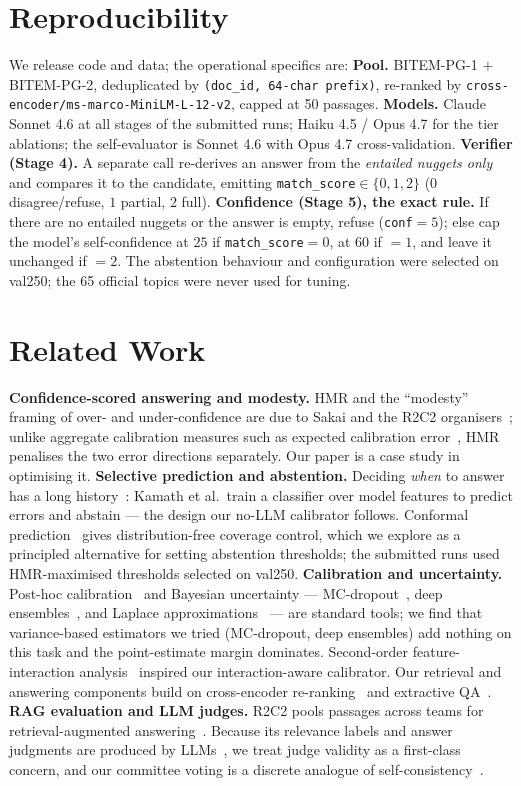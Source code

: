 \documentclass[sigconf,nonacm]{acmart}
\newcommand{\HMR}{\textsc{HMR}}
\begin{document}
\section{Reproducibility}
\label{sec:repro}
We release code and data; the operational specifics are:
\textbf{Pool.} BITEM-PG-1 $+$ BITEM-PG-2, deduplicated by \texttt{(doc\_id, 64-char prefix)},
re-ranked by \texttt{cross-encoder/\allowbreak ms-marco-\allowbreak MiniLM-L-12-v2}, capped at 50 passages.
\textbf{Models.} Claude Sonnet 4.6 at all stages of the submitted runs; Haiku 4.5 / Opus 4.7
for the tier ablations; the self-evaluator is Sonnet 4.6 with Opus 4.7 cross-validation.
\textbf{Verifier (Stage 4).} A separate call re-derives an answer from the \emph{entailed
nuggets only} and compares it to the candidate, emitting \texttt{match\_score}$\in\{0,1,2\}$
($0$ disagree/refuse, $1$ partial, $2$ full).
\textbf{Confidence (Stage 5), the exact rule.} If there are no entailed nuggets or the answer
is empty, refuse (\texttt{conf}$=5$); else cap the model's self-confidence at $25$ if
\texttt{match\_score}$=0$, at $60$ if $=1$, and leave it unchanged if $=2$. The abstention
behaviour and configuration were selected on val250; the 65 official topics were never used
for tuning.

\section{Related Work}
\label{sec:related}
\textbf{Confidence-scored answering and modesty.} \HMR{} and the ``modesty'' framing of
over- and under-confidence are due to Sakai and the R2C2 organisers~\cite{sakai-hmr,modesty,brevrag};
unlike aggregate calibration measures such as expected calibration error~\cite{guo2017},
\HMR{} penalises the two error directions separately. Our paper is a case study in optimising
it.
\textbf{Selective prediction and abstention.} Deciding \emph{when} to answer has a long
history~\cite{kamath2020}: Kamath et al.\ train a classifier over model features to predict
errors and abstain --- the design our no-LLM calibrator follows. Conformal
prediction~\cite{conformal2023,mohri2024} gives distribution-free coverage control, which we
explore as a principled alternative for setting abstention thresholds; the submitted runs
used \HMR-maximised thresholds selected on val250.
\textbf{Calibration and uncertainty.} Post-hoc calibration~\cite{guo2017} and Bayesian
uncertainty --- MC-dropout~\cite{gal2016}, deep ensembles~\cite{ensembles2017}, and Laplace
approximations~\cite{laplace2021} --- are standard tools; we find that variance-based
estimators we tried (MC-dropout, deep ensembles) add nothing on this task and the
point-estimate margin dominates. Second-order
feature-interaction analysis~\cite{smoothhess,inthessians} inspired our interaction-aware
calibrator. Our retrieval and answering components build on cross-encoder
re-ranking~\cite{monobert} and extractive QA~\cite{squad2,roberta,electra,minilm}.
\textbf{RAG evaluation and LLM judges.} R2C2 pools passages across teams for retrieval-augmented
answering~\cite{rag}. Because its relevance labels and answer judgments are produced by
LLMs~\cite{llmjudge}, we treat judge validity as a first-class concern, and our committee
voting is a discrete analogue of self-consistency~\cite{selfconsistency}.
\end{document}
